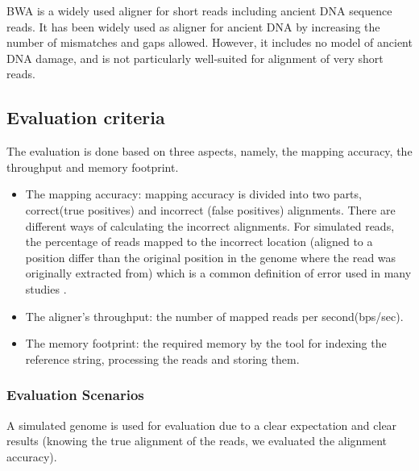 \documentclass[11pt,a4paper]{report}
\begin{document}
BWA is a widely used aligner for short reads including ancient
DNA sequence reads.
It has been widely used as aligner for ancient DNA by increasing 
the number of mismatches and gaps allowed.  
However, it includes no model of ancient DNA damage, and is not 
particularly well-suited for alignment of very short reads.



\subsection{Evaluation criteria} \label{Evaluation criteria}

The evaluation is done based on three aspects, namely, 
the mapping accuracy, the throughput and memory footprint.

\begin{itemize}

 \item The mapping accuracy: mapping accuracy is divided into two parts,
 correct(true positives) and 
incorrect (false positives) alignments.
There are different ways of calculating the incorrect alignments. For simulated 
reads, the percentage of reads mapped to the incorrect location (aligned to 
a position differ than the original position in the genome where the read was 
originally extracted from) which is a common definition of error used in many 
studies \cite{ErrorDef}.

 \item The aligner's throughput: the number of mapped reads per second(bps/sec).

 \item The memory footprint: the required memory by the tool for indexing 
the reference string, processing the reads and storing them. 

\end{itemize}
 



\subsubsection{Evaluation Scenarios} \label{Evaluation Scenarios}

A simulated genome is used for evaluation due to a clear expectation
and clear results (knowing the true alignment of the reads, 
we evaluated the alignment accuracy).\\
\end{document}
